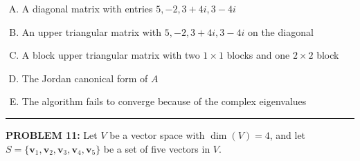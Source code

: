 \documentclass[12pt]{amsart}
\newcommand{\divider}{
  \vspace{-1em} %
  \noindent
  \raisebox{-0.15ex}{\textbullet}%
  \hspace{0.5em}%
  \rule[0.5ex]{0.95\textwidth}{1.0pt}%
  \hspace{0.5em}%
  \raisebox{-0.15ex}{\textbullet}%
  \vspace{0em} %
}
\begin{document}
{\begin{enumerate}[(A)]
\item A diagonal matrix with entries $5, -2, 3+4i, 3-4i$

\item An upper triangular matrix with $5, -2, 3+4i, 3-4i$ on the diagonal

\item A block upper triangular matrix with two $1 \times 1$ blocks and one $2 \times 2$ block

\item The Jordan canonical form of $A$

\item The algorithm fails to converge because of the complex eigenvalues
\end{enumerate}


\divider



{\bf PROBLEM 11:}
% 
Let $V$ be a vector space with $\dim(V) = 4$, and let $S = \{\mathbf{v}_1, \mathbf{v}_2, \mathbf{v}_3, \mathbf{v}_4, \mathbf{v}_5\}$ be a set of five vectors in $V$. 

}
\end{document}
